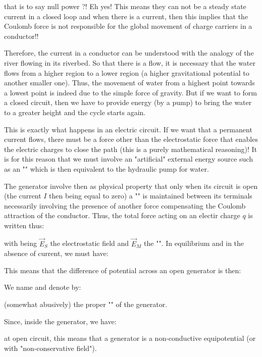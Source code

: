 	that is to say null power ?! Eh yes! This means they can not be a steady state current in a closed loop and when there is a current, then this implies that the Coulomb force is not responsible for the global movement of charge carriers in a conductor!!

	Therefore, the current in a conductor can be understood with the analogy of the river flowing in its riverbed. So that there is a flow, it is necessary that the water flows from a higher region to a lower region (a higher gravitational potential to another smaller one). Thus, the movement of water from a highest point towards a lowest point is indeed due to the simple force of gravity. But if we want to form a closed circuit, then we have to provide energy (by a pump) to bring the water to a greater height and the cycle starts again.
	
	This is exactly what happens in an electric circuit. If we want that a permanent current flows, there must be a force other than the electrostatic force that enables the electric charges to close the path (this is a purely mathematical reasoning)! It is for this reason that we must involve an "artificial" external energy source such as an "" which is then equivalent to the hydraulic pump for water.
	
	The generator involve then as physical property that only when its circuit is open (the current $I$ then being equal to zero) a "" is maintained between its terminals necessarily involving the presence of another force compensating the Coulomb attraction of the conductor. Thus, the total force acting on an electir charge $q$ is written thus:
	
	with being $\vec{E}_S$ the electrostatic field and $\vec{E}_M$ the "". In equilibrium and in the absence of current, we must have:
	
	This means that the difference of potential across an open generator is then:
	
	We name and denote by:
	
	(somewhat abusively) the proper "" of the generator.
	
	Since, inside the generator, we have:
	
	at open circuit, this means that a generator is a non-conductive equipotential (or with "non-conservative field").

